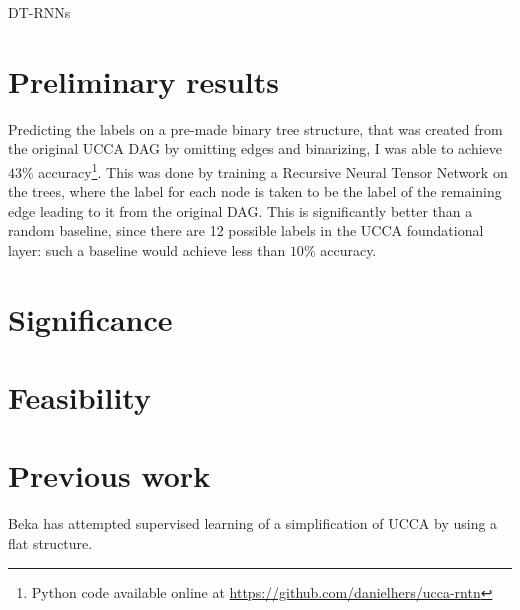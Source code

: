 \documentclass[11pt]{article}
\begin{document}
DT-RNNs



\section{Preliminary results}

Predicting the labels on a pre-made binary tree structure, that was created from the original UCCA DAG by omitting edges and binarizing, I was able to achieve $43\%$ accuracy\footnote{Python code available online at \url{https://github.com/danielhers/ucca-rntn}}. This was done by training a Recursive Neural Tensor Network\cite{socher2013recursive} on the trees, where the label for each node is taken to be the label of the remaining edge leading to it from the original DAG. This is significantly better than a random baseline, since there are 12 possible labels in the UCCA foundational layer: such a baseline would achieve less than $10\%$ accuracy.



\section{Significance}



\section{Feasibility}



\section{Previous work}

Beka \cite{beka2013thesis} has attempted supervised learning of a simplification of UCCA by using a flat structure.


{}

\end{document}

